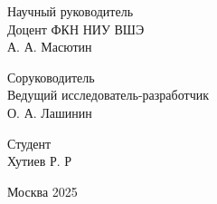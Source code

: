 \begin{flushright} %

    \begin{flushright} %
        Научный руководитель\\
        Доцент ФКН НИУ ВШЭ\\
        А. А. Масютин\\
    \end{flushright}

    \underline{\hspace{5cm}}

    \begin{flushright} %
        Соруководитель \\
        Ведущий исследователь-разработчик \\
        О. А. Лашинин
    \end{flushright}

    \underline{\hspace{5cm}}

    \begin{flushright} %
        Студент \\
        Хутиев Р. Р
    \end{flushright}
    \underline{\hspace{5cm}}

    
\end{flushright}
\vfill
\begin{center} \small Москва 2025 \end{center}
\thispagestyle{empty}
\pagebreak
